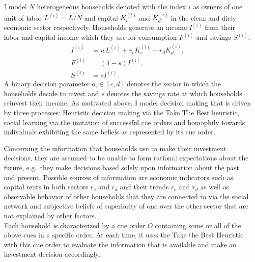I model $N$ heterogeneous households denoted with the index $i$ as owners of one unit of labor $L^{(i)} = L/N$ and capital $K_c^{(i)}$ and $K_d^{(i)}$ in the clean and dirty economic sector respectively.
Households generate an income $I^{(i)}$ from their labor and capital income which they use for consumption $F^{(i)}$ and savings $S^{(i)}$:
\begin{align}
	I^{(i)} &= w L^{(i)} + r_c K_c^{(i)} + r_d K_d^{(i)}, \label{eq:household_income} \\
	F^{(i)} &= (1-s) I^{(i)}, \label{eq:consumption} \\
	S^{(i)} &= s I^{(i)}. \label{eq:savings}
\end{align}
A binary decision parameter $o_i \in [c,d]$ denotes the sector in which the households decide to invest and $s$ denotes the savings rate at which households reinvest their income. As motivated above, I model decision making that is driven by three processes: Heuristic decision making via the Take The Best heuristic, social learning via the imitation of successful cue orders and homophily towards individuals exhibiting the same beliefs as represented by its cue order. \par

Concerning the information that households use to make their investment decisions, they are assumed to be unable to form rational expectations about the future, e.g.\ they make decisions based solely upon information about the past and present. Possible sources of information are economic indicators such as capital rents in both sectors $r_c$ and $r_d$ and their trends $\dot{r}_c$ and $\dot{r}_d$ as well as observable behavior of other households that they are connected to via the social network and subjective beliefs of superiority of one over the other sector that are not explained by other factors.\\
Each household is characterized by a cue order $O$ containing some or all of the above cues in a specific order. At each time, it uses the Take the Best Heuristic with this cue order to evaluate the information that is available and make an investment decision accordingly.
\par

